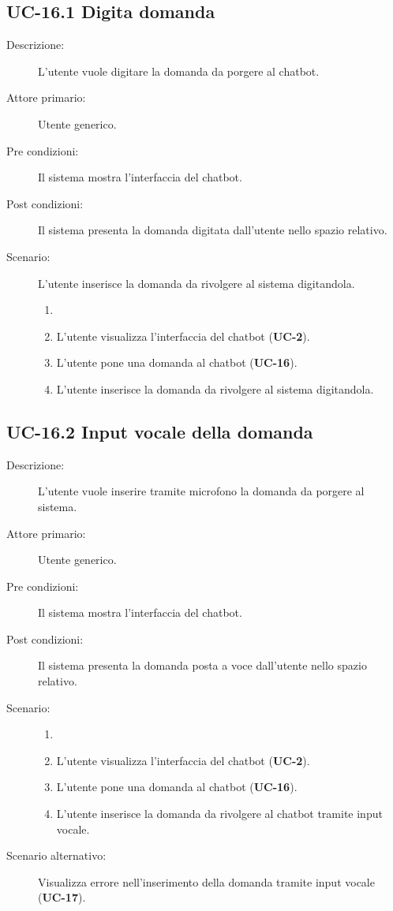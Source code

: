\subsection{UC-16.1 Digita domanda}
\begin{description}
    \item[Descrizione:] L'utente vuole digitare la domanda da porgere al chatbot.
    \item[Attore primario:] Utente generico.
    \item[Pre condizioni:] Il sistema mostra l'interfaccia del chatbot.
    \item[Post condizioni:] Il sistema presenta la domanda digitata dall'utente nello spazio relativo.
    \item[Scenario:] L'utente inserisce la domanda da rivolgere al sistema digitandola.
    \begin{enumerate}
        \item[] 
        \item L’utente visualizza l'interfaccia del chatbot (\textbf{UC-2}).
        \item L’utente pone una domanda al chatbot (\textbf{UC-16}).
        \item L'utente inserisce la domanda da rivolgere al sistema digitandola.
    \end{enumerate}
\end{description}

\subsection{UC-16.2 Input vocale della domanda}
\begin{description}
    \item[Descrizione:] L'utente vuole inserire tramite microfono la domanda da porgere al sistema.
    \item[Attore primario:] Utente generico.
    \item[Pre condizioni:] Il sistema mostra l'interfaccia del chatbot.
    \item[Post condizioni:] Il sistema presenta la domanda posta a voce dall'utente nello spazio relativo.
    \item[Scenario:]
    \begin{enumerate}
        \item[] 
        \item L’utente visualizza l'interfaccia del chatbot (\textbf{UC-2}).
        \item L’utente pone una domanda al chatbot (\textbf{UC-16}).
        \item L'utente inserisce la domanda da rivolgere al chatbot tramite input vocale.
    \end{enumerate}
    \item[Scenario alternativo:] Visualizza errore nell'inserimento della domanda tramite input vocale (\textbf{UC-17}).
\end{description}

